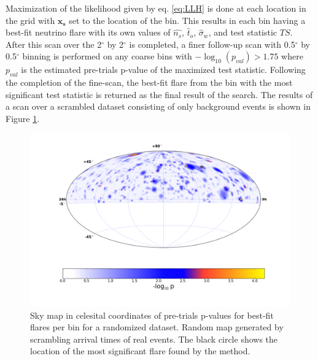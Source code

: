 \documentclass{gatech-thesis}
\begin{document}
Maximization of the likelihood given by eq. \eqref{eq:LLH} is done at each location in the grid with $\mathbf{x_s}$ set to the location of the bin. This results in each bin having a best-fit neutrino flare with its own values of $\hat{n_s}$, $\hat{t}_o$, $\hat{\sigma}_w$, and test statistic $TS$. After this scan over the 2$^{\circ}$ by 2$^{\circ}$ is completed, a finer follow-up scan with 0.5$^{\circ}$ by 0.5$^{\circ}$ binning is performed on any coarse bins with $-\log_{10}(p_{val}) > 1.75$ where $p_{val}$ is the estimated pre-trials p-value of the maximized test statistic. Following the completion of the fine-scan, the best-fit flare from the bin with the most significant test statistic is returned as the final result of the search. The results of a scan over a scrambled dataset consisting of only background events is shown in Figure \ref{fig:NullTrialSkyMap}.
\begin{figure}[ht]
  \begin{center}
    \includegraphics[width=1.0\textwidth,keepaspectratio]{NullMap996.png}
  \end{center}
  \caption{Sky map in celesital coordinates of pre-trials p-values for best-fit flares per bin for a randomized dataset. Random map generated by scrambling arrival times of real events. The black circle shows the location of the most significant flare found by the method. }
  \label{fig:NullTrialSkyMap}
\end{figure}
\end{document}
